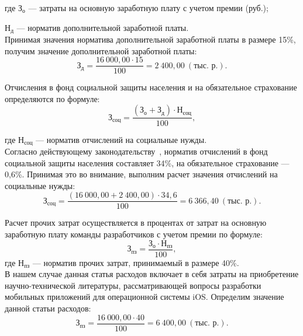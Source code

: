 \noindent где
\( \text{З}_{\text{о}} \)
--- затраты на основную заработную плату с учетом премии (руб.); \par
\noindent \hspace{6.5mm} \( \text{Н}_{\text{д}} \)
--- норматив дополнительной заработной платы. \\

Принимая значения норматива дополнительной заработной платы в размере 15\%,
получим значение дополнительной заработной платы:
\begin{equation}
  \text{З}_{\text{д}} =
  \dfrac{16 \: 000{,}00 \cdot 15}{100} = 2 \: 400{,}00 \: (\text{тыс.~р.}).
\end{equation}

Отчисления в фонд социальной защиты населения и на обязательное страхование
определяются по формуле:
\begin{equation}
  \text{З}_{\text{соц}} =
  \dfrac{(\text{З}_{\text{о}} + \text{З}_{\text{д}}) \cdot \text{Н}_{\text{соц}}}{100},
\end{equation}

\noindent где
\( \text{Н}_{\text{соц}} \) --- норматив отчислений на социальные нужды. \\

Согласно действующему законодательству~\cite{law_social_royalties},
норматив отчислений в фонд социальной защиты населения составляет 34\%,
на обязательное страхование --- 0,6\%. Принимая это во внимание,
выполним расчет значения отчислений на социальные нужды:
\begin{equation}
  \text{З}_{\text{соц}} =
  \dfrac{(16 \: 000{,}00 + 2 \: 400{,}00) \cdot 34{,}6}{100} = 6 \: 366{,}40 \: (\text{тыс.~р.}).
\end{equation}

Расчет прочих затрат осуществляется в процентах от затрат на основную
заработную плату команды разработчиков с учетом премии по формуле:
\begin{equation}
  \text{З}_{\text{пз}} =
  \dfrac{\text{З}_{\text{о}} \cdot \text{Н}_{\text{пз}}}{100},
\end{equation}
\noindent где
\( \text{Н}_{\text{пз}} \)
--- норматив прочих затрат, принимаемый в размере 40\%. \\

В нашем случае данная статья расходов включает в себя затраты
на приобретение научно-технической литературы, рассматривающей вопросы
разработки мобильных приложений для операционной системы iOS.
Определим значение данной статьи расходов:
\begin{equation}
  \text{З}_{\text{пз}} =
  \dfrac{16 \: 000{,}00 \cdot 40}{100} = 6 \: 400{,}00 \: (\text{тыс.~р.}).
\end{equation}

